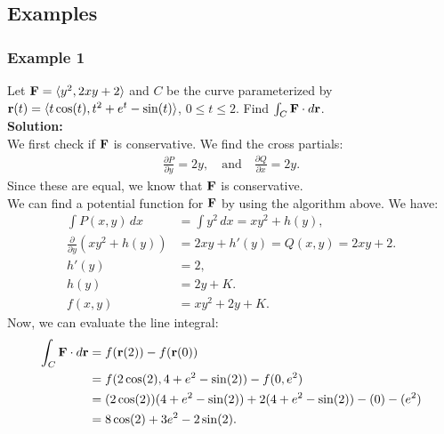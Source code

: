 \subsection{Examples}

\subsubsection{Example 1}

Let \(\mathbf{F} = \langle y^{2}, 2xy + 2 \rangle\) and \(C\) be the curve parameterized by \(\mathbf{r}(t) = \langle t\cos(t), t^{2} + e^{t} - \sin(t) \rangle\), \(0 \leq t \leq 2\). Find \(\int_C \mathbf{F} \cdot d\mathbf{r}\). \\

\textbf{Solution:} \\
We first check if \(\mathbf{F}\) is conservative. We find the cross partials:
\begin{align*}
    \frac{\partial P}{\partial y} = 2y, \quad \text{and} \quad 
    \frac{\partial Q}{\partial x} = 2y.
\end{align*}
Since these are equal, we know that \(\mathbf{F}\) is conservative. \\

We can find a potential function for \(\mathbf{F}\) by using the algorithm above. We have:
\begin{align*}
    \int P(x,y) \, dx &= \int y^{2} \, dx = xy^{2} + h(y), \\
    \frac{\partial}{\partial y} (xy^{2} + h(y)) &= 2xy + h'(y) = Q(x,y) = 2xy + 2. \\
    h'(y) &= 2, \\
    h(y) &= 2y + K. \\
    f(x,y) &= xy^{2} + 2y + K.
\end{align*}
Now, we can evaluate the line integral:
\begin{align*}
    \int_C \mathbf{F} \cdot d\mathbf{r} &= f(\mathbf{r}(2)) - f(\mathbf{r}(0)) \\
    &= f(2\cos(2), 4 + e^{2} - \sin(2)) - f(0, e^{2}) \\
    &= (2\cos(2))(4 + e^{2} - \sin(2)) + 2(4 + e^{2} - \sin(2)) - (0) - (e^{2}) \\ 
    &= 8\cos(2) + 3e^{2} - 2\sin(2).
\end{align*}
